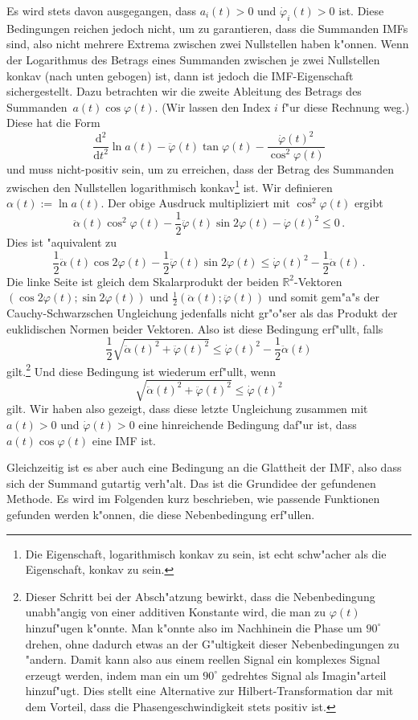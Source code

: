 \documentclass[a4paper]{scrartcl}
\newcommand{\R}{{\mathbb{R}}}
\newcommand{\de}{{\mathrm{d}}}
\newcommand{\pphi}{{\varphi}}
\begin{document}
Es wird stets davon ausgegangen, dass $a_i(t)>0$ und $\dot\pphi_i(t)>0$ ist. 
Diese Bedingungen reichen jedoch nicht, um zu garantieren, dass die Summanden IMFs sind, also nicht mehrere Extrema zwischen zwei Nullstellen haben k"onnen. 
Wenn der Logarithmus des Betrags eines Summanden zwischen je zwei Nullstellen konkav (nach unten gebogen) ist, dann ist jedoch die IMF-Eigenschaft sichergestellt. 
Dazu betrachten wir die zweite Ableitung des Betrags des Summanden~$a(t)\cos\pphi(t)$. 
(Wir lassen den Index $i$ f"ur diese Rechnung weg.)
Diese hat die Form
$$ \frac{\de^2}{\de t^2}\ln a(t)
-\ddot\pphi(t)\tan\pphi(t)
-\frac{\dot\pphi(t)^2}{\cos^2\pphi(t)} $$
und muss nicht-positiv sein, um zu erreichen, dass der Betrag des Summanden zwischen den Nullstellen logarithmisch konkav\footnote{Die Eigenschaft, logarithmisch konkav zu sein, ist echt schw"acher als die Eigenschaft, konkav zu sein.} ist. 
Wir definieren $\alpha(t):=\ln a(t)$. 
Der obige Ausdruck multipliziert mit $\cos^2\pphi(t)$ ergibt
$$ \ddot\alpha(t)\cos^2\pphi(t)
-\frac12\ddot\pphi(t)\sin2\pphi(t)
-\dot\pphi(t)^2
\le 0\,. $$
Dies ist "aquivalent zu
$$ \frac12\ddot\alpha(t)\cos2\pphi(t)
-\frac12\ddot\pphi(t)\sin2\pphi(t)
\le \dot\pphi(t)^2-\frac12\ddot\alpha(t)\,. $$
Die linke Seite ist gleich dem Skalarprodukt der beiden $\R^2$-Vektoren $(\cos2\pphi(t);\sin2\pphi(t))$ und $\frac12(\ddot\alpha(t);\ddot\pphi(t))$ und somit gem"a"s der Cauchy-Schwarzschen Ungleichung jedenfalls nicht gr"o"ser als das Produkt der euklidischen Normen beider Vektoren. Also ist diese Bedingung erf"ullt, falls 
$$ \frac12\sqrt{\ddot\alpha(t)^2+\ddot\pphi(t)^2}
\le \dot\pphi(t)^2-\frac12\ddot\alpha(t) $$
gilt.\footnote{Dieser Schritt bei der Absch"atzung bewirkt, dass die Nebenbedingung unabh"angig von einer additiven Konstante wird, die man zu $\pphi(t)$ hinzuf"ugen k"onnte. 
Man k"onnte also im Nachhinein die Phase um $90^\circ$ drehen, ohne dadurch etwas an der G"ultigkeit dieser Nebenbedingungen zu "andern.
Damit kann also aus einem reellen Signal ein komplexes Signal erzeugt werden, indem man ein um $90^\circ$ gedrehtes Signal als Imagin"arteil hinzuf"ugt. 
Dies stellt eine Alternative zur Hilbert-Transformation dar mit dem Vorteil, dass die Phasengeschwindigkeit stets positiv ist.
}
Und diese Bedingung ist wiederum erf"ullt, wenn
$$ \sqrt{\ddot\alpha(t)^2+\ddot\pphi(t)^2}
\le \dot\pphi(t)^2 $$
gilt. Wir haben also gezeigt, dass diese letzte Ungleichung zusammen mit $a(t)>0$ und $\dot\pphi(t)>0$ eine hinreichende Bedingung daf"ur ist, dass $a(t)\cos\pphi(t)$ eine IMF ist. 

Gleichzeitig ist es aber auch eine Bedingung an die Glattheit der IMF, also dass sich der Summand \glqq{}gutartig\grqq{} verh"alt.
Das ist die Grundidee der gefundenen Methode. 
Es wird im Folgenden kurz beschrieben, wie passende Funktionen gefunden werden k"onnen, die diese Nebenbedingung erf"ullen. 
\end{document}
